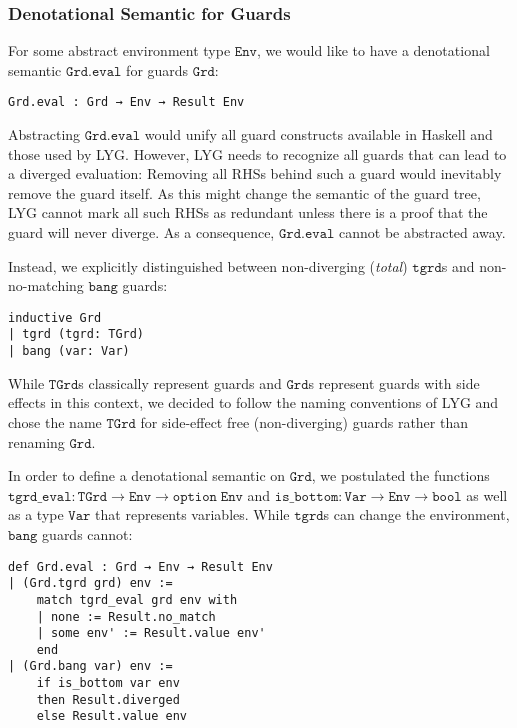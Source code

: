 \subsubsection{Denotational Semantic for Guards}

For some abstract environment type $\mathtt{Env}$, we would like to have a denotational semantic $\mathtt{Grd.eval}$ for guards $\mathtt{Grd}$:
\begin{verbatim}
Grd.eval : Grd → Env → Result Env
\end{verbatim}

Abstracting $\mathtt{Grd.eval}$ would unify all guard constructs available in Haskell and those used by LYG.
However, LYG needs to recognize all guards that can lead to a diverged evaluation:
Removing all RHSs behind such a guard would inevitably remove the guard itself.
As this might change the semantic of the guard tree, LYG cannot mark all such RHSs as redundant unless there is a proof that the guard will never diverge.
As a consequence, $\mathtt{Grd.eval}$ cannot be abstracted away.

Instead, we explicitly distinguished between non-diverging (\textit{total}) $\mathtt{tgrd}$s and non-no-matching $\mathtt{bang}$ guards:
\begin{verbatim}
inductive Grd
| tgrd (tgrd: TGrd)
| bang (var: Var)
\end{verbatim}

While $\mathtt{TGrd}$s classically represent guards and $\mathtt{Grd}$s represent guards with side effects in this context,
we decided to follow the naming conventions of LYG and chose the name $\mathtt{TGrd}$ for side-effect free (non-diverging) guards
rather than renaming $\mathtt{Grd}$.

In order to define a denotational semantic on $\mathtt{Grd}$, we postulated the functions $\mathtt{tgrd\_eval}: \mathtt{TGrd} \to \mathtt{Env} \to \mathtt{option}\;\mathtt{Env}$ and $\mathtt{is\_bottom}: \mathtt{Var} \to \mathtt{Env} \to \mathtt{bool}$ as well as a type $\mathtt{Var}$ that represents variables. While $\mathtt{tgrd}$s can change the environment,
$\mathtt{bang}$ guards cannot:

\begin{verbatim}
def Grd.eval : Grd → Env → Result Env
| (Grd.tgrd grd) env :=
    match tgrd_eval grd env with
    | none := Result.no_match
    | some env' := Result.value env'
    end
| (Grd.bang var) env :=
    if is_bottom var env
    then Result.diverged
    else Result.value env
\end{verbatim}

